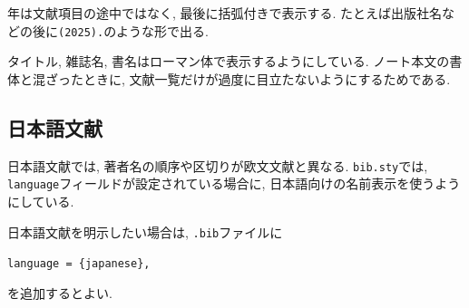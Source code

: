\documentclass[../main.tex]{subfiles}
\begin{document}
年は文献項目の途中ではなく, 最後に括弧付きで表示する. 
たとえば出版社名などの後に\texttt{(2025).}のような形で出る. 

タイトル, 雑誌名, 書名はローマン体で表示するようにしている. 
ノート本文の書体と混ざったときに, 文献一覧だけが過度に目立たないようにするためである. 

\subsection{日本語文献}

日本語文献では, 著者名の順序や区切りが欧文文献と異なる. 
\texttt{bib.sty}では, \texttt{language}フィールドが設定されている場合に, 日本語向けの名前表示を使うようにしている. 

日本語文献を明示したい場合は, \texttt{.bib}ファイルに
\begin{center}
	\verb|language = {japanese},|
\end{center}
を追加するとよい. 
\end{document}
